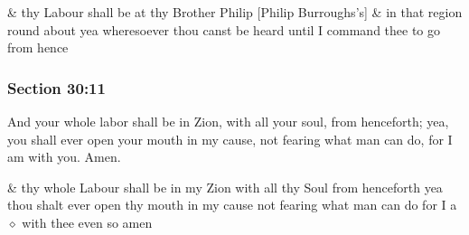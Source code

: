 		\begin{framed}
		\scriptsize
			\begin{compactdesc}
				\item[JSP] \& thy Labour shall be at thy Brother Philip [Philip Burroughs's] \& in that region round about yea wheresoever thou canst be heard until I command thee to go from hence
			\end{compactdesc}
		\end{framed}

	\subsubsection{Section 30:11} %
		\label{DC30-11}

		And your whole labor shall be in Zion, with all your soul, from henceforth; yea, you shall ever open your mouth in my cause, not fearing what man can do, for I am with you.  Amen.

		\begin{framed}
		\scriptsize
			\begin{compactdesc}
				\item[JSP] \& thy whole Labour shall be in my Zion with all thy Soul from henceforth yea thou shalt ever open thy mouth in my cause not fearing what man can do for I a$\diamond$ with thee even so amen
			\end{compactdesc}
		\end{framed}